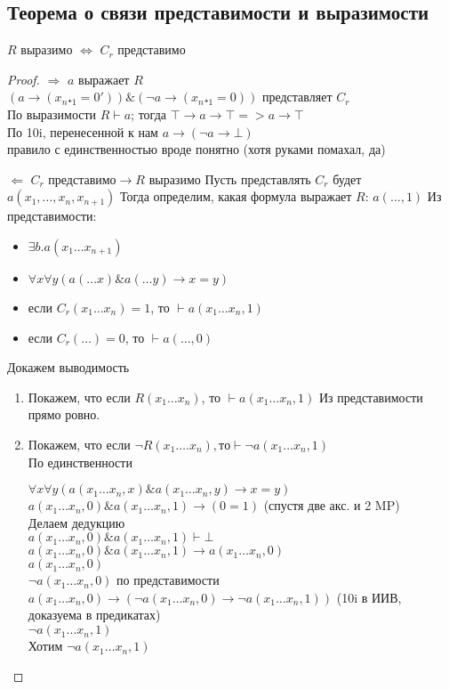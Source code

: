 \subsection{Теорема о связи представимости и выразимости}
\label{sec-11-2}
\begin{theorem}
$R$ выразимо $\Leftrightarrow$ $C_r$ представимо
\end{theorem}
\begin{proof}
$\Rightarrow$ $a$ выражает $R$\\
$(a \to (x_n₊_1=0')) \& (\lnot a \to (x_n₊_1=0))$
представляет $C_r$\\
По выразимости $R \vdash a$; тогда $⊤\to a\to ⊤ => a\to ⊤$\\
По 10i, перенесенной к нам $a \to (\lnot a \to ⊥)$\\
правило с единственностью вроде понятно (хотя руками помахал, да)

$\Leftarrow$ $C_r \text{ представимо} \to R \text{ выразимо}$
Пусть представлять $C_r$ будет
$a(x_1, \dotsc, x_n,x_{n+1})$
Тогда определим, какая формула выражает $R$:
$a(\dotsc, 1)$
Из представимости:
\begin{itemize}
\item $\exists b.a(x_1\ldots{}x_{n+1})$
\item $\forall x\forall y(a(\ldots{}x) \& a(\ldots{} y) \to x = y)$
\item если $C_r(x_1\ldots{}x_n) = 1$, то $\vdash a(x_1\ldots{}x_n,1)$
\item если $C_r(\dots) = 0$, то $\vdash a(\dotsc, 0)$
\end{itemize}
Докажем выводимость
\begin{enumerate}
\item Покажем, что если $R(x_1\ldots{}x_n)$, то $\vdash a(x_1\ldots{}x_n, 1)$
Из представимости прямо ровно.
\item Покажем, что если $\lnot R(x_1\ldots{}.x_n), то \vdash \lnot a(x_1\ldots{}x_n, 1)$\\
По единственности

$\forall x\forall y(a(x_1\ldots{}x_n, x) \& a(x_1\ldots{}x_n, y) \to x = y)$\\
$a(x_1\ldots{}x_n, 0) \& a(x_1\ldots{}x_n, 1) \to (0 = 1)$ (спустя две акс. и 2 MP)\\
Делаем дедукцию\\
$a(x_1\ldots{}x_n, 0) \& a(x_1\ldots{}x_n, 1) \vdash ⊥$\\
$a(x_1\ldots{}x_n, 0) \& a(x_1\ldots{}x_n, 1) \to a(x_1\ldots{}x_n, 0)$\\
$a(x_1\ldots{}x_n, 0)$\\
$\lnot a(x_1\ldots{}x_n, 0)$ по представимости
$a(x_1\ldots{}x_n, 0) \to (\lnot a(x_1\ldots{}x_n, 0) \to \lnot a(x_1\ldots{}x_n, 1))$ (10i в ИИВ, доказуема в предикатах)\\
$\lnot a(x_1\ldots{}x_n, 1)$\\
Хотим $\lnot a(x_1\ldots{}x_n, 1)$
\end{enumerate}
\end{proof}
